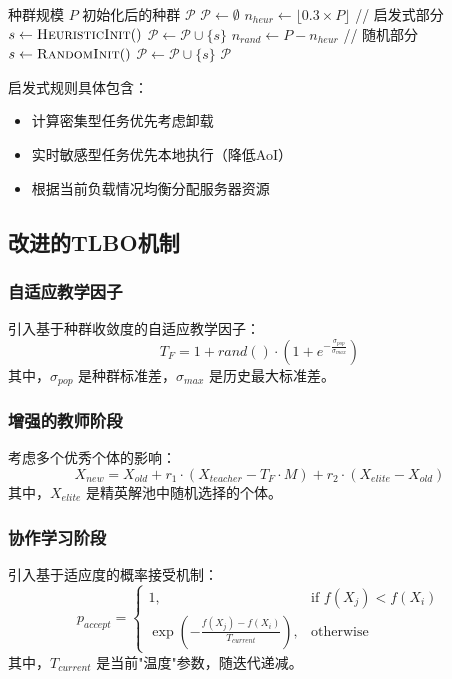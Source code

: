 \documentclass[conference]{IEEEtran}
\begin{document}
\begin{algorithm}[H]
  \caption{智能初始化策略}
  \label{alg:init}
  \begin{algorithmic}[1]
    \REQUIRE 种群规模 $P$
    \ENSURE 初始化后的种群 $\mathcal{P}$
    \STATE $\mathcal{P} \leftarrow \emptyset$
    \STATE $n_{heur} \leftarrow \lfloor 0.3 \times P \rfloor$ // 启发式部分
        \STATE $s \leftarrow \textsc{HeuristicInit}()$
        \STATE $\mathcal{P} \leftarrow \mathcal{P} \cup \{s\}$
    \ENDFOR
    \STATE $n_{rand} \leftarrow P - n_{heur}$ // 随机部分
        \STATE $s \leftarrow \textsc{RandomInit}()$
        \STATE $\mathcal{P} \leftarrow \mathcal{P} \cup \{s\}$
    \ENDFOR
    \RETURN $\mathcal{P}$
  \end{algorithmic}
\end{algorithm}

启发式规则具体包含：
\begin{itemize}
    \item 计算密集型任务优先考虑卸载
    \item 实时敏感型任务优先本地执行（降低AoI）
    \item 根据当前负载情况均衡分配服务器资源
\end{itemize}

\subsection{改进的TLBO机制}
\subsubsection{自适应教学因子}
引入基于种群收敛度的自适应教学因子\cite{b14}：
\begin{equation}
T_F = 1 + rand() \cdot \left(1 + e^{-\frac{\sigma_{pop}}{\sigma_{max}}}\right)
\end{equation}
其中，$\sigma_{pop}$ 是种群标准差，$\sigma_{max}$ 是历史最大标准差。
\subsubsection{增强的教师阶段}
考虑多个优秀个体的影响：
\begin{equation}
X_{new} = X_{old} + r_1 \cdot (X_{teacher} - T_F \cdot M) + r_2 \cdot (X_{elite} - X_{old})
\end{equation}
其中，$X_{elite}$ 是精英解池中随机选择的个体。

\subsubsection{协作学习阶段}
引入基于适应度的概率接受机制：
\begin{equation}
p_{accept} = \begin{cases}
1, & \text{if } f(X_j) < f(X_i) \\
\exp\left(-\frac{f(X_j) - f(X_i)}{T_{current}}\right), & \text{otherwise}
\end{cases}
\end{equation}
其中，$T_{current}$ 是当前"温度"参数，随迭代递减。
\end{document}
